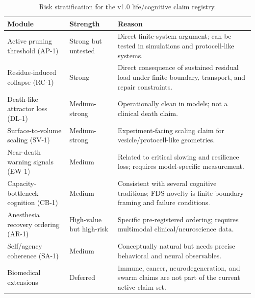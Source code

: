 \documentclass[10pt,a4paper,twocolumn,aps,prl]{revtex4-2}
\theoremstyle{claimstyle}
\theoremstyle{definition}
\begin{document}
\begin{table}[t]
\centering
\small
\begin{tabular}{lll}
\toprule
\parbox[t]{4.5cm}{\raggedright\textbf{Module}} & \parbox[t]{2.3cm}{\raggedright\textbf{Strength}} & \parbox[t]{8cm}{\raggedright\textbf{Reason}} \\
\midrule
\parbox[t]{4.5cm}{\raggedright Active pruning threshold (AP-1)} & \parbox[t]{2.3cm}{\raggedright Strong but untested} & \parbox[t]{8cm}{\raggedright Direct finite-system argument; can be tested in simulations and protocell-like systems.} \\
\parbox[t]{4.5cm}{\raggedright Residue-induced collapse (RC-1)} & \parbox[t]{2.3cm}{\raggedright Strong} & \parbox[t]{8cm}{\raggedright Direct consequence of sustained residual load under finite boundary, transport, and repair constraints.} \\
\parbox[t]{4.5cm}{\raggedright Death-like attractor loss (DL-1)} & \parbox[t]{2.3cm}{\raggedright Medium-strong} & \parbox[t]{8cm}{\raggedright Operationally clean in models; not a clinical death claim.} \\
\parbox[t]{4.5cm}{\raggedright Surface-to-volume scaling (SV-1)} & \parbox[t]{2.3cm}{\raggedright Medium-strong} & \parbox[t]{8cm}{\raggedright Experiment-facing scaling claim for vesicle/protocell-like geometries.} \\
\parbox[t]{4.5cm}{\raggedright Near-death warning signals (EW-1)} & \parbox[t]{2.3cm}{\raggedright Medium} & \parbox[t]{8cm}{\raggedright Related to critical slowing and resilience loss; requires model-specific measurement.} \\
\parbox[t]{4.5cm}{\raggedright Capacity-bottleneck cognition (CB-1)} & \parbox[t]{2.3cm}{\raggedright Medium} & \parbox[t]{8cm}{\raggedright Consistent with several cognitive traditions; FDS novelty is finite-boundary framing and failure conditions.} \\
\parbox[t]{4.5cm}{\raggedright Anesthesia recovery ordering (AR-1)} & \parbox[t]{2.3cm}{\raggedright High-value but high-risk} & \parbox[t]{8cm}{\raggedright Specific pre-registered ordering; requires multimodal clinical/neuroscience data.} \\
\parbox[t]{4.5cm}{\raggedright Self/agency coherence (SA-1)} & \parbox[t]{2.3cm}{\raggedright Medium} & \parbox[t]{8cm}{\raggedright Conceptually natural but needs precise behavioral and neural observables.} \\
\parbox[t]{4.5cm}{\raggedright Biomedical extensions} & \parbox[t]{2.3cm}{\raggedright Deferred} & \parbox[t]{8cm}{\raggedright Immune, cancer, neurodegeneration, and swarm claims are not part of the current active claim set.} \\
\bottomrule
\end{tabular}
\caption{Risk stratification for the v1.0 life/cognitive claim registry.}
\end{table}
\end{document}
